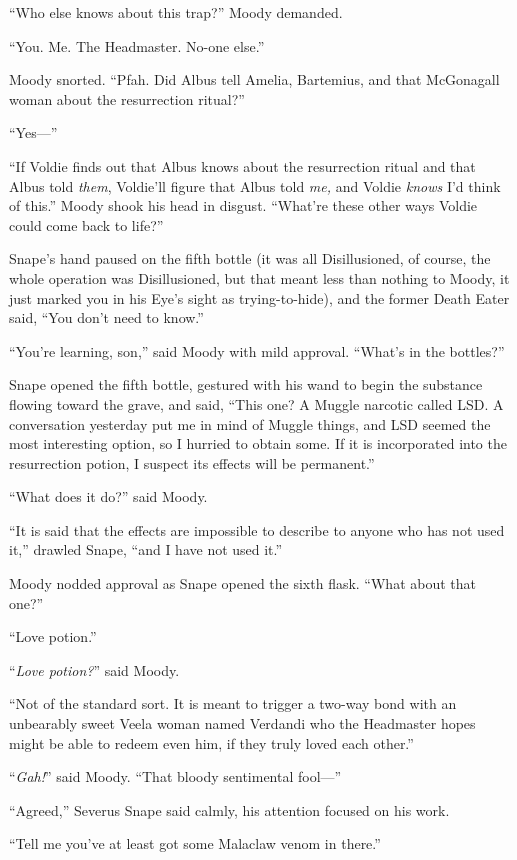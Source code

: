 “Who else knows about this trap?” Moody demanded.

“You. Me. The Headmaster. No-one else.”

Moody snorted. “Pfah. Did Albus tell Amelia, Bartemius, and that McGonagall woman about the resurrection ritual?”

“Yes—”

“If Voldie finds out that Albus knows about the resurrection ritual and that Albus told \emph{them}, Voldie’ll figure that Albus told \emph{me,} and Voldie \emph{knows} I’d think of this.” Moody shook his head in disgust. “What’re these other ways Voldie could come back to life?”

Snape’s hand paused on the fifth bottle (it was all Disillusioned, of course, the whole operation was Disillusioned, but that meant less than nothing to Moody, it just marked you in his Eye’s sight as trying-to-hide), and the former Death Eater said, “You don’t need to know.”

“You’re learning, son,” said Moody with mild approval. “What’s in the bottles?”

Snape opened the fifth bottle, gestured with his wand to begin the substance flowing toward the grave, and said, “This one? A Muggle narcotic called LSD. A conversation yesterday put me in mind of Muggle things, and LSD seemed the most interesting option, so I hurried to obtain some. If it is incorporated into the resurrection potion, I suspect its effects will be permanent.”

“What does it do?” said Moody.

“It is said that the effects are impossible to describe to anyone who has not used it,” drawled Snape, “and I have not used it.”

Moody nodded approval as Snape opened the sixth flask. “What about that one?”

“Love potion.”

“\emph{Love potion?}” said Moody.

“Not of the standard sort. It is meant to trigger a two-way bond with an unbearably sweet Veela woman named Verdandi who the Headmaster hopes might be able to redeem even him, if they truly loved each other.”

“\emph{Gah!}” said Moody. “That bloody sentimental fool—”

“Agreed,” Severus Snape said calmly, his attention focused on his work.

“Tell me you’ve at least got some Malaclaw venom in there.”


